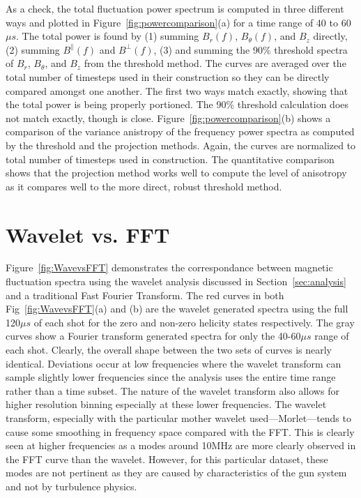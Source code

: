 \documentclass[preprint2]{aastex}
\begin{document}
As a check, the total fluctuation power spectrum is computed in three different ways and plotted in Figure~\ref{fig:powercomparison}(a) for a time range of 40 to 60$\mu s$. The total power is found by (1) summing $B_{r}(f)$, $B_{\theta}(f)$, and $B_{z}$ directly, (2) summing $B^{\parallel}(f)$ and $B^{\perp}(f)$, (3) and summing the 90\% threshold spectra of $B_{r}$, $B_{\theta}$, and $B_{z}$ from the threshold method. The curves are averaged over the total number of timesteps used in their construction so they can be directly compared amongst one another. The first two ways match exactly, showing that the total power is being properly portioned. The 90\% threshold calculation does not match exactly, though is close. Figure~\ref{fig:powercomparison}(b) shows a comparison of the variance anistropy of the frequency power spectra as computed by the threshold and the projection methods. Again, the curves are normalized to total number of timesteps used in construction. The quantitative comparison shows that the projection method works well to compute the level of anisotropy as it compares well to the more direct, robust threshold method.

\section{Wavelet vs. FFT}\label{sec:WaveFFT}

Figure~\ref{fig:WavevsFFT} demonstrates the correspondance between magnetic fluctuation spectra using the wavelet analysis discussed in Section~\ref{sec:analysis} and a traditional Fast Fourier Transform. The red curves in both Fig~\ref{fig:WavevsFFT}(a) and (b) are the wavelet generated spectra using the full 120$\mu s$ of each shot for the zero and non-zero helicity states respectively. The gray curves show a Fourier transform generated spectra for only the 40-60$\mu s$ range of each shot. Clearly, the overall shape between the two sets of curves is nearly identical. Deviations occur at low frequencies where the wavelet transform can sample slightly lower frequencies since the analysis uses the entire time range rather than a time subset. The nature of the wavelet transform also allows for higher resolution binning especially at these lower frequencies. The wavelet transform, especially with the particular mother wavelet used---Morlet---tends to cause some smoothing in frequency space compared with the FFT. This is clearly seen at higher frequencies as a modes around 10MHz are more clearly observed in the FFT curve than the wavelet. However, for this particular dataset, these modes are not pertinent as they are caused by characteristics of the gun system and not by turbulence physics.
\end{document}
